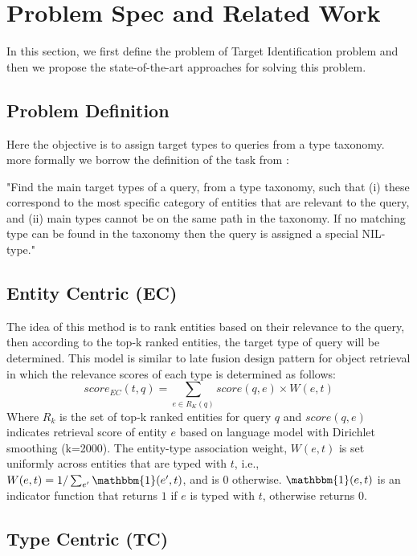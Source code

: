 \section{Problem Spec and Related Work}
In this section, we first define the problem of Target Identification problem and then we propose the state-of-the-art approaches for solving this problem.

\subsection{Problem Definition}
Here the objective is to assign target types to queries from a type taxonomy. more formally we borrow the definition of the task from \cite{Garigliotti:2017:TTI:3077136.3080659}:

"Find the main target types of a query, from a type taxonomy, such that (i) these correspond to the most specific category of entities that are relevant to the query, and (ii) main types cannot be on the same path in the taxonomy. If no matching type can be found in the taxonomy then the query is assigned a special NIL-type."

\subsection{Entity Centric (EC)}\label{EC}
The idea of this method is to rank entities based on their relevance to the query, then according to the top-k ranked entities, the target type of query will be determined. This model is similar to late fusion design pattern for object retrieval \cite{zhang2017design} in which the relevance scores of each type is determined as follows:
\begin{equation}
score_{EC}(t,q) = \sum_{e\in R_K(q)}{score(q,e)\times W(e,t)}
\end{equation}
Where $R_k$ is the set of top-k ranked entities for query $q$ and $score(q,e)$ indicates retrieval score of entity $e$ based on language model with Dirichlet smoothing (k=2000). The entity-type association weight, $W(e,t)$ is set uniformly across entities that are typed with $t$, i.e., $W(e,t)=1/\sum_{e^\prime}{\mathbbm{1}(e^\prime,t)}$, and is 0 otherwise.
$\mathbbm{1}(e,t)$ is an indicator function that returns $1$ if $e$ is typed with $t$, otherwise returns $0$.

\subsection{Type Centric (TC)}

